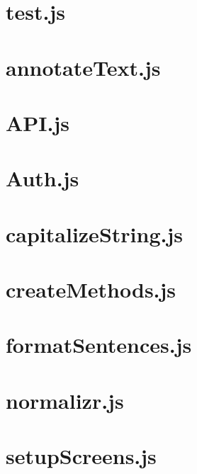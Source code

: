 \documentclass[a4paper,landscape]{report}
\begin{document}
\newpage
\section{test.js}


\newpage
\section{annotateText.js}


\newpage
\section{API.js}


\newpage
\section{Auth.js}


\newpage
\section{capitalizeString.js}


\newpage
\section{createMethods.js}


\newpage
\section{formatSentences.js}


\newpage
\section{normalizr.js}


\newpage
\section{setupScreens.js}

\end{document}
